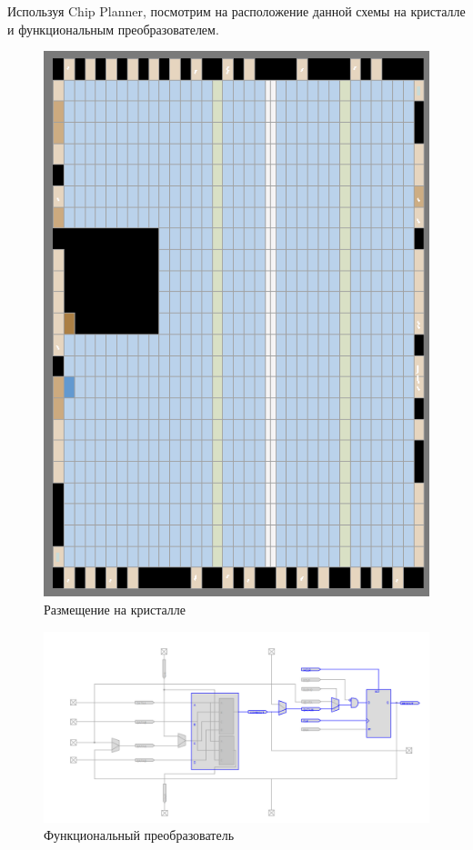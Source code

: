 \documentclass[a4paper,12pt]{article}
\begin{document}
    Используя Chip Planner, посмотрим на расположение данной схемы на кристалле и функциональным преобразователем. 
    \begin{figure}[H]
		\centering
		\includegraphics[width=0.38\linewidth]{polytech/scheme/report-lab3/subfiles/images/crystal}
		\caption{Размещение на кристалле}
		\label{fig:crystal}
	\end{figure}
    \begin{figure}[H]
		\centering
		\includegraphics[width=\linewidth]{polytech/scheme/report-lab3/subfiles/images/func_trans}
		\caption{Функциональный преобразователь}
		\label{fig:func_trans}
	\end{figure}
\end{document}
